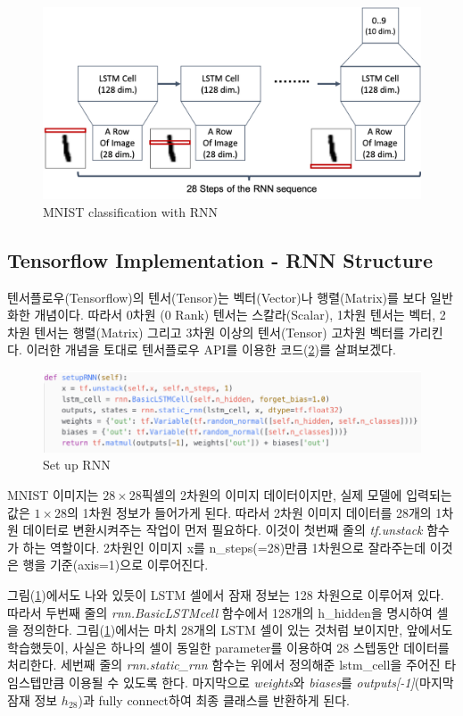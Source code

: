\documentclass[draft=false]{oblivoir}
\begin{document}
\begin{figure}[ht] \centering 
  \includegraphics[scale=0.5]{fig17.png}
  \caption{MNIST classification with RNN}
  \label{fig:16-17}
\end{figure}

\subsection{Tensorflow Implementation - RNN Structure}
텐서플로우(Tensorflow)의 텐서(Tensor)는 벡터(Vector)나 행렬(Matrix)를 보다 일반화한 개념이다. 따라서 0차원 (0 Rank) 텐서는 스칼라(Scalar), 1차원 텐서는 벡터, 2차원 텐서는 행렬(Matrix) 그리고 3차원 이상의 텐서(Tensor)  고차원 벡터를 가리킨다. 이러한 개념을 토대로 텐서플로우 API를 이용한 코드(\ref{fig:16-18})를 살펴보겠다.
\begin{figure}[ht] \centering 
  \includegraphics[scale=1.0]{fig18.png}
  \caption{Set up RNN}
  \label{fig:16-18}
\end{figure}

MNIST 이미지는 $28 \times 28$픽셀의 2차원의 이미지 데이터이지만, 실제 모델에 입력되는 값은 $1\times 28$의 1차원 정보가 들어가게 된다. 따라서 2차원 이미지 데이터를 28개의 1차원 데이터로 변환시켜주는 작업이 먼저 필요하다. 이것이 첫번째 줄의 \textit{tf.unstack} 함수가 하는 역할이다.  2차원인 이미지 x를 n\_steps(=28)만큼 1차원으로 잘라주는데 이것은 행을 기준(axis=1)으로 이루어진다.\par
그림(\ref{fig:16-17})에서도 나와 있듯이 LSTM 셀에서 잠재 정보는 128 차원으로 이루어져 있다. 따라서 두번째 줄의 \textit{rnn.BasicLSTMcell} 함수에서 128개의 h\_hidden을 명시하여 셀을 정의한다. 그림(\ref{fig:16-17})에서는 마치 28개의 LSTM 셀이 있는 것처럼 보이지만, 앞에서도 학습했듯이, 사실은 하나의 셀이 동일한 parameter를 이용하여 28 스텝동안 데이터를 처리한다. 세번째 줄의 \textit{rnn.static\_rnn} 함수는 위에서 정의해준 lstm\_cell을 주어진 타임스텝만큼 이용될 수 있도록 한다. 마지막으로 \textit{weights}와 \textit{biases}를 \textit{outputs[-1]}(마지막 잠재 정보 $h_{28}$)과 fully connect하여 최종 클래스를 반환하게 된다.
\end{document}
